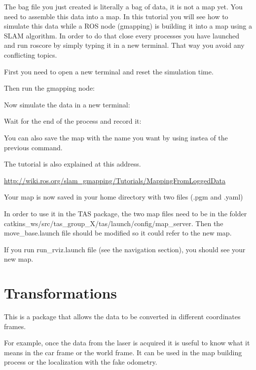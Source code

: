 The bag file you just created is literally a bag of data, it is not a map yet. You need to assemble this data into a map. In this tutorial you will see how to simulate this data while a ROS node (gmapping) is building it into a map using a SLAM algorithm. In order to do that close every processes you have launched and run roscore by simply typing it in a new terminal. That way you avoid any conflicting topics.

First you need to open a new terminal and reset the simulation time.


Then run the gmapping node:


Now simulate the data in a new terminal:


Wait for the end of the process and record it:


You can also save the map with the name you want by using  instea of the previous command.


The tutorial is also explained at this address.

\hyperref[http://wiki.ros.org/slam_gmapping/Tutorials/MappingFromLoggedData]{http://wiki.ros.org/slam\_gmapping/Tutorials/MappingFromLoggedData}

Your map is now saved in your home directory with two files (.pgm and .yaml)

In order to use it in the TAS package, the two map files need to be in the folder catkins\_ws/src/tas\_group\_X/tas/launch/config/map\_server. Then the move\_base.launch file should be modified so it could refer to the new map.

If you run run\_rviz.launch file (see the navigation section), you should see your new map.



\section{Transformations}
\label{sec:tas_package_transformations}

This is a package that allows the data to be converted in different coordinates frames. 

For example, once the data from the laser is acquired it is useful to know what it means in the car frame or the world frame. It can be used in the map building process or the localization with the fake odometry.

